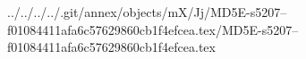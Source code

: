 ../../../../.git/annex/objects/mX/Jj/MD5E-s5207--f01084411afa6c57629860cb1f4efcea.tex/MD5E-s5207--f01084411afa6c57629860cb1f4efcea.tex